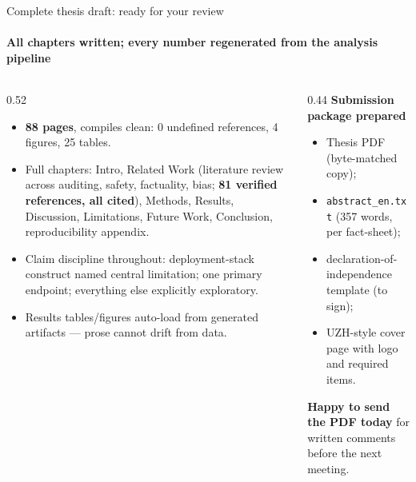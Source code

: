 \documentclass[aspectratio=169,onlytextwidth]{beamer}
\begin{document}
\begin{frame}[shrink=8]{Complete thesis draft: ready for your review}
\framesubtitle{All chapters written; every number regenerated from the analysis pipeline}
\begin{columns}[T,totalwidth=\textwidth]
\begin{column}{0.52\textwidth}
\small
\begin{itemize}
  \item \textbf{88 pages}, compiles clean: 0 undefined references, 4 figures, 25 tables.
  \item Full chapters: Intro, Related Work (literature review across auditing, safety, factuality, bias; \textbf{81 verified references, all cited}), Methods, Results, Discussion, Limitations, Future Work, Conclusion, reproducibility appendix.
  \item Claim discipline throughout: deployment-stack construct named central limitation; one primary endpoint; everything else explicitly exploratory.
  \item Results tables/figures auto-load from generated artifacts --- prose cannot drift from data.
\end{itemize}
\end{column}
\begin{column}{0.44\textwidth}
\textbf{Submission package prepared}\\[4pt]
\small
\begin{itemize}
  \item Thesis PDF (byte-matched copy);
  \item \texttt{abstract\_en.txt} (357 words, per fact-sheet);
  \item declaration-of-independence template (to sign);
  \item UZH-style cover page with logo and required items.
\end{itemize}
\vspace{0.2cm}
\textbf{Happy to send the PDF today} for written comments before the next meeting.
\end{column}
\end{columns}
\end{frame}
\end{document}
